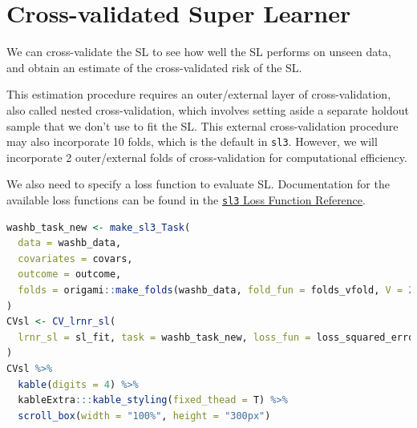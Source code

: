 \documentclass[
  12pt, krantz2,
]{krantz}
\newcommand{\passthrough}[1]{#1}
\theoremstyle{definition}
\theoremstyle{definition}
\theoremstyle{definition}
\newcommand{\1}{\mathbbm{1}}
\begin{document}
\hypertarget{cross-validated-super-learner}{%
\section*{Cross-validated Super Learner}\label{cross-validated-super-learner}}


We can cross-validate the SL to see how well the SL performs on unseen data, and
obtain an estimate of the cross-validated risk of the SL.

This estimation procedure requires an outer/external layer of
cross-validation, also called nested cross-validation, which involves setting
aside a separate holdout sample that we don't use to fit the SL. This external
cross-validation procedure may also incorporate 10 folds, which is the default
in \passthrough{\lstinline!sl3!}. However, we will incorporate 2 outer/external folds of
cross-validation for computational efficiency.

We also need to specify a loss function to evaluate SL. Documentation for the
available loss functions can be found in the \href{https://tlverse.org/sl3/reference/loss_functions.html}{\passthrough{\lstinline!sl3!} Loss Function
Reference}.

\begin{lstlisting}[language=R]
washb_task_new <- make_sl3_Task(
  data = washb_data,
  covariates = covars,
  outcome = outcome,
  folds = origami::make_folds(washb_data, fold_fun = folds_vfold, V = 2)
)
CVsl <- CV_lrnr_sl(
  lrnr_sl = sl_fit, task = washb_task_new, loss_fun = loss_squared_error
)
CVsl %>%
  kable(digits = 4) %>%
  kableExtra:::kable_styling(fixed_thead = T) %>%
  scroll_box(width = "100%", height = "300px")
\end{lstlisting}
\end{document}

